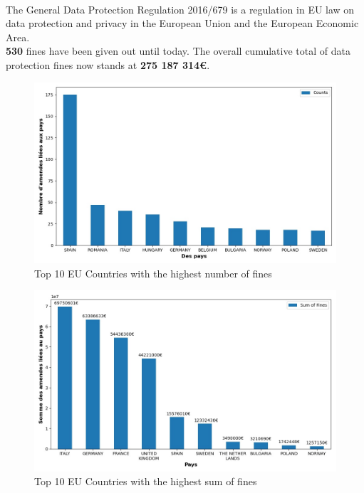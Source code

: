 \documentclass[12pt]{article}
\begin{document}

\noindent\HorRule{3pt} \\[-0.75\baselineskip]
\HorRule{1pt}

\vspace{0.5cm}
	\SepRule
\vspace{0.5cm}


\justify
The General Data Protection Regulation 2016/679 is a regulation in EU law on data protection and privacy in the European Union and the European Economic Area. \\
\textbf{530} fines have been given out until today.
The overall cumulative total of data protection fines now stands at \textbf{275 187 314€}.


\begin{figure}
	[H]\centering\includegraphics[width=0.7\linewidth]{graphs/top10_countries}
      \caption{Top 10 EU Countries with the highest number of fines }
\end{figure}
\begin{figure}
	[H]\centering\includegraphics[width=0.7\linewidth]{graphs/top10_countries_fines}
	\caption{Top 10 EU Countries with the highest sum of fines}
 \end{figure}
\end{document}
